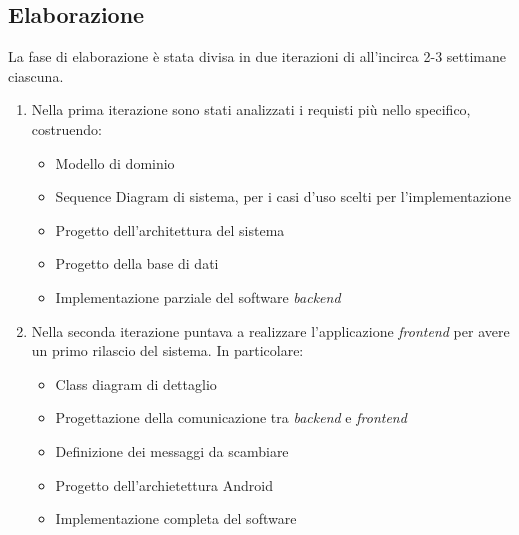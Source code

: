\subsection{Elaborazione}
La fase di elaborazione è stata divisa in due iterazioni di all'incirca 2-3 settimane ciascuna.
\begin{enumerate}
	\item Nella prima iterazione sono stati analizzati i requisti più nello specifico, costruendo:
	\begin{itemize}
		\item Modello di dominio
		\item Sequence Diagram di sistema, per i casi d'uso scelti per l'implementazione
		\item Progetto dell'architettura del sistema
		\item Progetto della base di dati
		\item Implementazione parziale del software \textit{backend}
	\end{itemize}
	\item Nella seconda iterazione puntava a realizzare l'applicazione \textit{frontend} per avere un primo rilascio del sistema. In particolare:
	\begin{itemize}
		\item Class diagram di dettaglio
		\item Progettazione della comunicazione tra  \textit{backend} e \textit{frontend}
		\item Definizione dei messaggi da scambiare
		\item Progetto dell'archietettura Android
		\item Implementazione completa del software
	\end{itemize}
\end{enumerate}